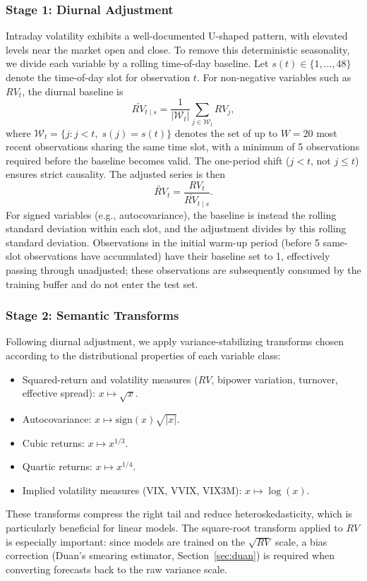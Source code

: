 \subsubsection{Stage 1: Diurnal Adjustment}
\label{sec:diurnal}

Intraday volatility exhibits a well-documented U-shaped pattern, with elevated levels near the market open and close. To remove this deterministic seasonality, we divide each variable by a rolling time-of-day baseline. Let $s(t) \in \{1, \ldots, 48\}$ denote the time-of-day slot for observation $t$. For non-negative variables such as $RV_t$, the diurnal baseline is
\begin{equation}
    \bar{RV}_{t \mid s} = \frac{1}{|\mathcal{W}_t|} \sum_{j \in \mathcal{W}_t} RV_j,
    \label{eq:diurnal_mean}
\end{equation}
where $\mathcal{W}_t = \{j : j < t,\; s(j) = s(t)\}$ denotes the set of up to $W = 20$ most recent observations sharing the same time slot, with a minimum of 5 observations required before the baseline becomes valid. The one-period shift ($j < t$, not $j \leq t$) ensures strict causality. The adjusted series is then
\begin{equation}
    \widetilde{RV}_t = \frac{RV_t}{\bar{RV}_{t \mid s}}.
    \label{eq:diurnal_adj}
\end{equation}
For signed variables (e.g., autocovariance), the baseline is instead the rolling standard deviation within each slot, and the adjustment divides by this rolling standard deviation. Observations in the initial warm-up period (before 5 same-slot observations have accumulated) have their baseline set to 1, effectively passing through unadjusted; these observations are subsequently consumed by the training buffer and do not enter the test set.

\subsubsection{Stage 2: Semantic Transforms}
\label{sec:semantic_transforms}

Following diurnal adjustment, we apply variance-stabilizing transforms chosen according to the distributional properties of each variable class:
\begin{itemize}
    \item Squared-return and volatility measures ($RV$, bipower variation, turnover, effective spread): $x \mapsto \sqrt{x}$.
    \item Autocovariance: $x \mapsto \mathrm{sign}(x)\sqrt{|x|}$.
    \item Cubic returns: $x \mapsto x^{1/3}$.
    \item Quartic returns: $x \mapsto x^{1/4}$.
    \item Implied volatility measures (VIX, VVIX, VIX3M): $x \mapsto \log(x)$.
\end{itemize}
These transforms compress the right tail and reduce heteroskedasticity, which is particularly beneficial for linear models. The square-root transform applied to $RV$ is especially important: since models are trained on the $\sqrt{RV}$ scale, a bias correction (Duan's smearing estimator, Section~\ref{sec:duan}) is required when converting forecasts back to the raw variance scale.

